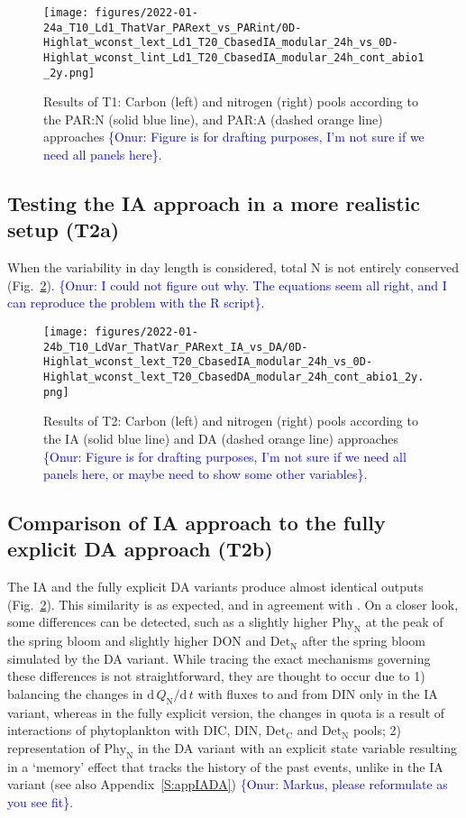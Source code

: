 \documentclass[gmd, manuscript, draft]{copernicus}
\newcommand{\onur}[1]{\textcolor{blue}{\{Onur: #1\}}}
\begin{document}
\begin{figure}[ht!]
\texttt{[image: figures/2022-01-24a\_T10\_Ld1\_ThatVar\_PARext\_vs\_PARint/0D-Highlat\_wconst\_lext\_Ld1\_T20\_CbasedIA\_modular\_24h\_vs\_0D-Highlat\_wconst\_lint\_Ld1\_T20\_CbasedIA\_modular\_24h\_cont\_abio1\_2y.png]}
\caption{Results of T1: Carbon (left) and nitrogen (right) pools according to the PAR:N (solid blue line), and PAR:A (dashed orange line) approaches \onur{Figure is for drafting purposes, I'm not sure if we need all panels here}.\label{f.T1res}}
\end{figure}

\FloatBarrier

\subsection{Testing the IA approach in a more realistic setup (T2a)}
When the variability in day length is considered, total N is not entirely conserved (Fig.~\ref{f.T2res}). \onur{I could not figure out why. The equations seem all right, and I can reproduce the problem with the R script}.

\begin{figure}[ht!]
\texttt{[image: figures/2022-01-24b\_T10\_LdVar\_ThatVar\_PARext\_IA\_vs\_DA/0D-Highlat\_wconst\_lext\_T20\_CbasedIA\_modular\_24h\_vs\_0D-Highlat\_wconst\_lext\_T20\_CbasedDA\_modular\_24h\_cont\_abio1\_2y.png]}
\caption{Results of T2: Carbon (left) and nitrogen (right) pools according to the IA (solid blue line) and DA (dashed orange line) approaches  \onur{Figure is for drafting purposes, I'm not sure if we need all panels here, or maybe need to show some other variables}.\label{f.T2res}}
\end{figure}

\subsection{Comparison of IA approach to the fully explicit DA approach (T2b)}
The IA and the fully explicit DA variants produce almost identical outputs (Fig.~\ref{f.T2res}). This similarity is as expected, and in agreement with \citet{Ward2017}. On a closer look, some differences can be detected, such as a slightly higher $\text{Phy}_{\text{N}}$ at the peak of the spring bloom and slightly higher DON and $\text{Det}_{\text{N}}$ after the spring bloom simulated by the DA variant. While tracing the exact mechanisms governing these differences is not straightforward, they are thought to occur due to 1) balancing the changes in $\text{d}\,Q_{\text{N}}/\text{d}\,t$ with fluxes to and from DIN only in the IA variant, whereas in the fully explicit version, the changes in quota is a result of interactions of phytoplankton with DIC, DIN, $\text{Det}_{\text{C}}$ and $\text{Det}_{\text{N}}$ pools; 2) representation of $\text{Phy}_{\text{N}}$ in the DA variant with an explicit state variable resulting in a `memory' effect that tracks the history of the past events, unlike in the IA variant (see also Appendix~\ref{S:appIADA}) \onur{Markus, please reformulate as you see fit}.
\end{document}
